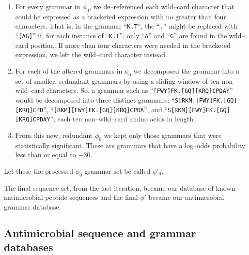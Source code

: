 \begin{enumerate}
                \begin{enumerate}
                    \item
                        For every grammar in $\phi_0$, we de--referenced
                        each wild--card character that could be expressed as a
                        bracketed expression with no greater than four characters.
                        That is, in the grammar ``\texttt{K.T}'', the ``\texttt{.}''
                        might be replaced with ``\texttt{[AG]}'' if, for each
                        instance of ``\texttt{K.T}'', only ``\texttt{A}'' and
                        ``\texttt{G}'' are found in the wild--card position.  If
                        more than four characters were needed in the bracketed
                        expression, we left the wild--card character instead.

                    \item  For each of the altered grammars in $\phi_0$ we decomposed
                        the grammar into a set of smaller, redundant grammars
                        by using a sliding window of ten non--wild--card characters.  So, a
                        grammar such as ``\texttt{[FWY]FK.[GQ][KRQ]CPDAY}''
                        would be decomposed into three distinct grammars:
                        ``\texttt{S[RKM][FWY]FK.[GQ][KRQ]CPD}'', ``\texttt{[RKM][FWY]FK.[GQ][KRQ]CPDA}'',
                         and ``\texttt{S[RKM][FWY]FK.[GQ][KRQ]CPDAY}'', each ten non--wild--card
                        amino acids in length.

                    \item  From this new, redundant $\phi_0$ we kept only those grammars that
                        were statistically significant.  These are grammars that have a
                        log--odds probability less than or equal to $-30$.

                \end{enumerate}
                Let these the processed $\phi_0$ grammar set be called $\phi'_0$.
        \end{enumerate}
            The final sequence set, from
            the last iteration, became our
            database of known antimicrobial
            peptide sequences and the final
            $\phi'$ became our antimicrobial
            grammar database.


    \subsection{Antimicrobial sequence and grammar databases}

